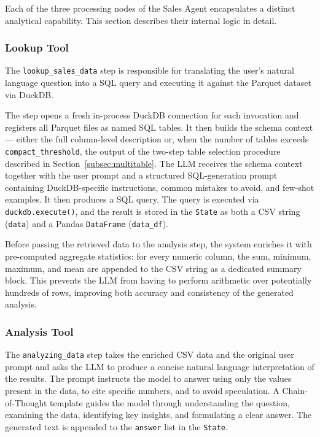 Each of the three processing nodes of the Sales Agent encapsulates a distinct
analytical capability. This section describes their internal logic in detail.

\subsubsection{Lookup Tool}

The \texttt{lookup\_sales\_data} step is responsible for translating the user's
natural language question into a SQL query and executing it against the Parquet
dataset via DuckDB.

The step opens a fresh in-process DuckDB connection for each invocation and
registers all Parquet files as named SQL tables. It then builds the schema context
— either the full column-level description or, when the number of tables exceeds
\texttt{compact\_threshold}, the output of the two-step table selection procedure
described in Section~\ref{subsec:multitable}. The LLM receives the schema context
together with the user prompt and a structured SQL-generation prompt containing
DuckDB-specific instructions, common mistakes to avoid, and few-shot examples.
It then produces a SQL query. The query is executed via
\texttt{duckdb.execute()}, and the result is stored in the \texttt{State} as both
a CSV string (\texttt{data}) and a Pandas \texttt{DataFrame}
(\texttt{data\_df}).

Before passing the retrieved data to the analysis step, the system enriches it with
pre-computed aggregate statistics: for every numeric column, the sum, minimum,
maximum, and mean are appended to the CSV string as a dedicated summary block.
This prevents the LLM from having to perform arithmetic over potentially hundreds of
rows, improving both accuracy and consistency of the generated analysis.

\subsubsection{Analysis Tool}

The \texttt{analyzing\_data} step takes the enriched CSV data and the original user
prompt and asks the LLM to produce a concise natural language interpretation of the
results. The prompt instructs the model to answer using only the values present in
the data, to cite specific numbers, and to avoid speculation. A Chain-of-Thought
template guides the model through understanding the question, examining the data,
identifying key insights, and formulating a clear answer. The generated text is
appended to the \texttt{answer} list in the \texttt{State}.


